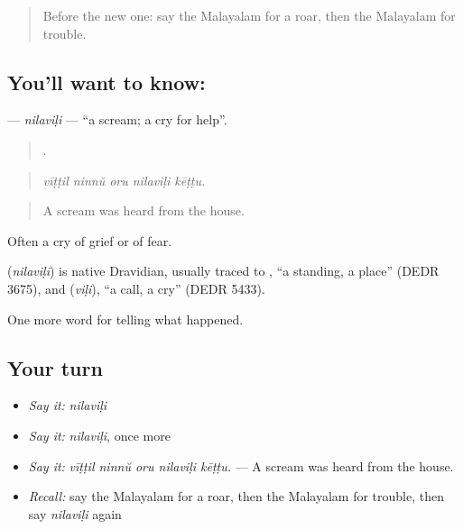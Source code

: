 \label{lesson:ML-C380-nilavili}



\begin{quote}
Before the new one: say the Malayalam for a roar, then the Malayalam for trouble.
\end{quote}

\subsection*{You'll want to know: }
\textbf{} — \emph{nilaviḷi} — \textquotedblleft{}a scream; a cry for help\textquotedblright{}.

\begin{quote}
    .
\end{quote}

\begin{quote}
\emph{vīṭṭil ninnŭ oru nilaviḷi kēṭṭu.}
\end{quote}

\begin{quote}
A scream was heard from the house.
\end{quote}

Often a cry of grief or of fear.

\begin{cousinweb}
\textbf{} (\emph{nilaviḷi}) is native Dravidian, usually traced to , \textquotedblleft{}a standing, a place\textquotedblright{} (DEDR 3675), and  (\emph{viḷi}), \textquotedblleft{}a call, a cry\textquotedblright{} (DEDR 5433).
\end{cousinweb}

\begin{grammarlens}[title={What you've built}]
One more word for telling what happened.
\end{grammarlens}

\subsection*{Your turn}
\begin{itemize}
\raggedright
  \item \emph{Say it:} \emph{nilaviḷi}
  \item \emph{Say it:} \emph{nilaviḷi}, once more
  \item \emph{Say it:} \emph{vīṭṭil ninnŭ oru nilaviḷi kēṭṭu.} — A scream was heard from the house.
  \item \emph{Recall:} say the Malayalam for a roar, then the Malayalam for trouble, then say \emph{nilaviḷi} again
\end{itemize}

